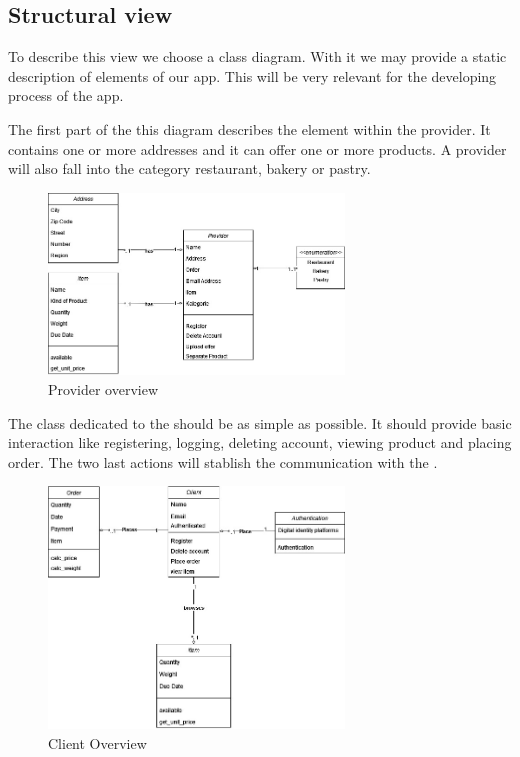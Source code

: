 \subsection{Structural view}
To describe this view we choose a \gls{class diagram}. With it we may provide a static description of elements
of our app. This will be very relevant for the developing process of the \gls{app}.

The first part of the this diagram describes the element within the \gls{provider}. It contains one or more addresses and it 
can offer one or more products. A provider will also fall into the category restaurant, bakery or pastry.

\begin{figure}[H]
    \centering
    \includegraphics[width=0.7\textwidth]{assets/Provider_Addr_Item.jpg}
    \caption{Provider overview}
    \label{fig:Provider_addr_item}
\end{figure}
 
The class dedicated to the  should be as simple as possible. It should provide basic interaction like
registering, logging, deleting account, viewing product and placing order. The two last actions will stablish the communication 
with the .

\begin{figure}[H]
    \centering
    \includegraphics[width=0.7\textwidth]{assets/client_CD.jpg}
    \caption{Client Overview}
    \label{fig:client_CD}
\end{figure}

